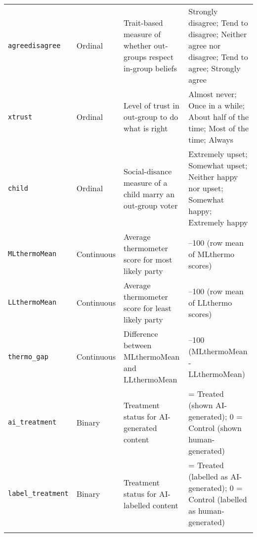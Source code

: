 \begin{longtable}[t]{>{\raggedright\arraybackslash}p{3.2cm}l>{\raggedright\arraybackslash}p{5cm}>{\raggedright\arraybackslash}p{5cm}}
\verb|agreedisagree| & Ordinal & Trait-based measure of whether out-groups respect in-group beliefs & Strongly disagree; Tend to disagree; Neither agree nor disagree; Tend to agree; Strongly agree\\
\verb|xtrust| & Ordinal & Level of trust in out-group to do what is right & Almost never; Once in a while; About half of the time; Most of the time; Always\\
\verb|child| & Ordinal & Social-disance measure of a child marry an out-group voter & Extremely upset; Somewhat upset; Neither happy nor upset; Somewhat happy; Extremely happy\\
\addlinespace
\verb|MLthermoMean| & Continuous & Average thermometer score for most likely party & 0–100 (row mean of MLthermo scores)\\
\verb|LLthermoMean| & Continuous & Average thermometer score for least likely party & 0–100 (row mean of LLthermo scores)\\
\verb|thermo_gap| & Continuous & Difference between MLthermoMean and LLthermoMean & 0–100 (MLthermoMean - LLthermoMean)\\
\verb|ai_treatment| & Binary & Treatment status for AI-generated content & 1 = Treated (shown AI-generated); 0 = Control (shown human-generated)\\
\verb|label_treatment| & Binary & Treatment status for AI-labelled content & 1 = Treated (labelled as AI-generated); 0 = Control (labelled as human-generated)\\*
\end{longtable}
\endgroup{}
